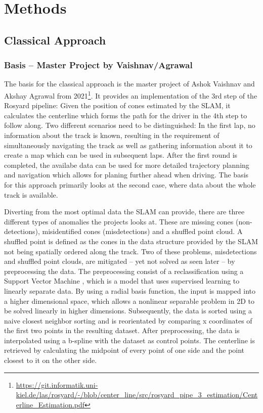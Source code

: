\graphicspath{{Chapter/Figs/methods/}}
\chapter{Methods}


\section{Classical Approach}

\subsection{Basis – Master Project by Vaishnav/Agrawal}
The basis for the classical approach is the master project of Ashok Vaishnav and Akshay Agrawal from 2021\footnote{\url{https://git.informatik.uni-kiel.de/las/rosyard/-/blob/center_line/src/rosyard_pipe_3_estimation/Centerline_Estimation.pdf}}.
It provides an implementation of the 3rd step of the Rosyard pipeline: Given the position of cones estimated by the SLAM, it calculates the centerline which forms the path for the driver in the 4th step to follow along.
Two different scenarios need to be distinguished: In the first lap, no information about the track is known, resulting in the requirement of simultaneously navigating the track as well as gathering information about it to create a map which can be used in subsequent laps. After the first round is completed, the availabe data can be used for more detailed trajectory planning and navigation which allows for planing further ahead when driving. The basis for this approach primarily looks at the second case, where data about the whole track is available.

Diverting from the most optimal data the SLAM can provide, there are three different types of anomalies the projects looks at. These are missing cones (non-detections), misidentified cones (misdetections) and a shuffled point cloud. A shuffled point is defined as the cones in the data structure provided by the SLAM not being spatially ordered along the track. Two of these problems, misdetections and shuffled point clouds, are mitigated – yet not solved as seen later – by preprocessing the data. The preprocessing consist of a reclassification using a Support Vector Machine \cite{cortes1995}, which is a model that uses supervised learning to linearly separate data. By using a radial basis function, the input is mapped into a higher dimensional space, which allows a nonlinear separable problem in 2D to be solved linearly in higher dimensions. Subsequently, the data is sorted using a naive closest neighbor sorting and is reorientated by comparing x coordinates of the first two points in the resulting dataset. After preprocessing, the data is interpolated using a b-spline with the dataset as control points. The centerline is retrieved by calculating the midpoint of every point of one side and the point closest to it on the other side.

